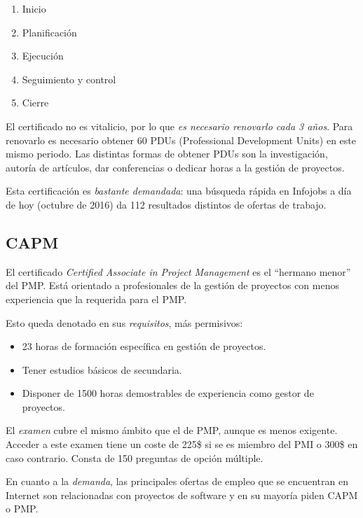 \begin{enumerate}
\item Inicio
\item Planificación
\item Ejecución
\item Seguimiento y control
\item Cierre
\end{enumerate}

El certificado no es vitalicio, por lo que \emph{es necesario renovarlo cada 3 años}. Para renovarlo es necesario obtener 60 PDUs (Professional Development Units) en este mismo periodo. Las distintas formas de obtener PDUs son la investigación, autoría de artículos, dar conferencias o dedicar horas a la gestión de proyectos.

Esta certificación es \emph{bastante demandada}: una búsqueda rápida en Infojobs a día de hoy (octubre de 2016) da 112 resultados distintos de ofertas de trabajo.

\subsection{CAPM}

El certificado \emph{Certified Associate in Project Management} es el ``hermano menor'' del PMP. Está orientado a profesionales de la gestión de proyectos con menos experiencia que la requerida para el PMP.

Esto queda denotado en sus \emph{requisitos}, más permisivos:

\begin{itemize}
\item 23 horas de formación específica en gestión de proyectos.
\item Tener estudios básicos de secundaria.
\item Disponer de 1500 horas demostrables de experiencia como gestor de proyectos.
\end{itemize}

El \emph{examen} cubre el mismo ámbito que el de PMP, aunque es menos exigente. Acceder a este examen tiene un coste de 225\$ si se es miembro del PMI o 300\$ en caso contrario. Consta de 150 preguntas de opción múltiple.

En cuanto a la \emph{demanda}, las principales ofertas de empleo que se encuentran en Internet son relacionadas con proyectos de software y en su mayoría piden CAPM o PMP.
